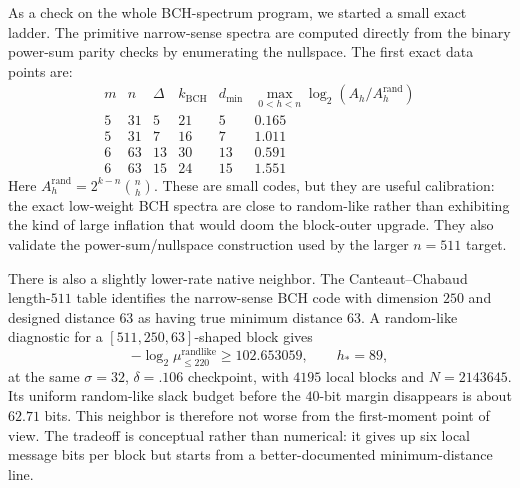 As a check on the whole BCH-spectrum program, we started a small exact ladder.  The primitive narrow-sense spectra are
computed directly from the binary power-sum parity checks by enumerating the nullspace.  The first exact data points
are:
\[
\begin{array}{c|c|c|c|c|c}
m & n & \Delta & k_{\mathrm{BCH}} & d_{\min} & \max_{0<h<n}\log_2(A_h/A_h^{\mathrm{rand}})\\
\hline
5 & 31 & 5 & 21 & 5 & 0.165\\
5 & 31 & 7 & 16 & 7 & 1.011\\
6 & 63 & 13 & 30 & 13 & 0.591\\
6 & 63 & 15 & 24 & 15 & 1.551
\end{array}
\]
Here \(A_h^{\mathrm{rand}}=2^{k-n}\binom{n}{h}\).  These are small codes, but they are useful calibration: the exact
low-weight BCH spectra are close to random-like rather than exhibiting the kind of large inflation that would doom the
block-outer upgrade.  They also validate the power-sum/nullspace construction used by the larger \(n=511\) target.

There is also a slightly lower-rate native neighbor.  The Canteaut--Chabaud length-\(511\) table identifies the
narrow-sense BCH code with dimension \(250\) and designed distance \(63\) as having true minimum distance \(63\).  A
random-like diagnostic for a \([511,250,63]\)-shaped block gives
\[
-\log_2\mu_{\le220}^{\mathrm{randlike}}\ge102.653059,
\qquad h_*=89,
\]
at the same \(\sigma=32\), \(\delta=.106\) checkpoint, with \(4195\) local blocks and
\(N=2143645\).  Its uniform random-like slack budget before the \(40\)-bit margin disappears is about \(62.71\) bits.
This neighbor is therefore not worse from the first-moment point of view.  The tradeoff is conceptual rather than
numerical: it gives up six local message bits per block but starts from a better-documented minimum-distance line.

